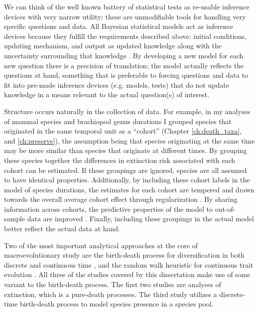 We can think of the well known battery of statistical tests \citep{Sokal2011} as re-usable inference devices with very narrow utility; these are unmodifiable tools for handling very specific questions and data. All Bayesian statistical models act as inference devices because they fulfill the requirements described above: initial conditions, updating mechanism, and output as updated knowledge along with the uncertainty surrounding that knowledge \citep{McElreath2016,Jaynes2003a}. By developing a new model for each new question there is a precision of translation; the model actually reflects the questions at hand, something that is preferable to forcing questions and data to fit into pre-made inference devices (e.g. models, tests) that do not update knowledge in a means relevant to the actual question(s) of interest.

Structure occurs naturally in the collection of data. For example, in my analyses of mammal species and brachiopod genus durations I grouped species that originated in the same temporal unit as a ``cohort'' (Chapter \ref{ch:death_taxa}, and \ref{ch:preserve}), the assumption being that species originating at the same time may be more similar than species that originate at different times. By grouping these species together the differences in extinction risk associated with each cohort can be estimated. If these groupings are ignored, species are all assumed to have identical properties. Additionally, by including these cohort labels in the model of species durations, the estimates for each cohort are tempered and drawn towards the overall average cohort effect through regularization \citep{Gelman2013d,McElreath2016}. By sharing information across cohorts, the predictive properties of the model to out-of-sample data are improved \citep{Gelman2013d,McElreath2016}. Finally, including these groupings in the actual model better reflect the actual data at hand.

Two of the most important analytical approaches at the core of macroevolutionary study are the birth-death process for diversification in both discrete and continuous time \citep{Raup1973,Raup1985,Nee1992,Nee1994a,Nee2001,Nee2006b,Stadler2013b}, and the random walk heuristic for continuous trait evolution \citep{Raup1974a,Felsenstein1985b,Bookstein1987b,Gingerich1993,Roopnarine2001a,Roopnarine2003b,Roopnarine1999,Sheets2001,Hunt2006a,Hunt2007a}. All three of the studies covered by this dissertation make use of some variant to the birth-death process. The first two studies are analyses of extinction, which is a pure-death processes. The third study utilizes a discrete-time birth-death process to model species presence in a species pool.

